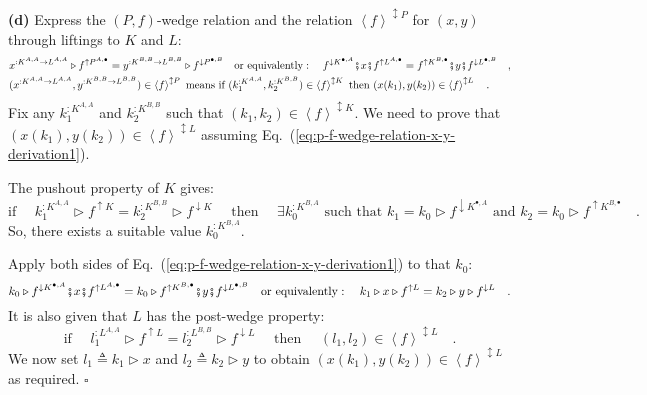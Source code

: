 \textbf{(d)} Express the $\left(P,f\right)$-wedge relation and the
relation $\left<f\right>^{\updownarrow P}$ for $(x,y)$ through liftings
to $K$ and $L$:
\begin{align}
 & x^{:K^{A,A}\rightarrow L^{A,A}}\triangleright f^{\uparrow P^{A,\bullet}}=y^{:K^{B,B}\rightarrow L^{B,B}}\triangleright f^{\downarrow P^{\bullet,B}}\quad\text{or equivalently}:\quad f^{\downarrow K^{\bullet,A}}\bef x\bef f^{\uparrow L^{A,\bullet}}=f^{\uparrow K^{B,\bullet}}\bef y\bef f^{\downarrow L^{\bullet,B}}\quad,\label{eq:p-f-wedge-relation-x-y-derivation1}\\
 & (x^{:K^{A,A}\rightarrow L^{A,A}},y^{:K^{B,B}\rightarrow L^{B,B}})\in\left<f\right>^{\updownarrow P}\text{ means if }(k_{1}^{:K^{A,A}},k_{2}^{:K^{B,B}})\in\left<f\right>^{\updownarrow K}\text{ then }(x(k_{1}),y(k_{2}))\in\left<f\right>^{\updownarrow L}\quad.\nonumber 
\end{align}
Fix any $k_{1}^{:K^{A,A}}$ and $k_{2}^{:K^{B,B}}$ such that $(k_{1},k_{2})\in\left<f\right>^{\updownarrow K}$.
We need to prove that $(x(k_{1}),y(k_{2}))\in\left<f\right>^{\updownarrow L}$
assuming Eq.~(\ref{eq:p-f-wedge-relation-x-y-derivation1}).

The pushout property of $K$ gives:
\[
\text{if }\quad k_{1}^{:K^{A,A}}\triangleright f^{\uparrow K}=k_{2}^{:K^{B,B}}\triangleright f^{\downarrow K}\quad\text{ then }\quad\exists k_{0}^{:K^{B,A}}\text{ such that }k_{1}=k_{0}\triangleright f^{\downarrow K^{\bullet,A}}\text{ and }k_{2}=k_{0}\triangleright f^{\uparrow K^{B,\bullet}}\quad.
\]
So, there exists a suitable value $k_{0}^{:K^{B,A}}$.%
\begin{comment}
By Statement~\ref{subsec:Statement-wedge-law-from-parametricity}(a),
the values $k_{1}$, $k_{2}$ are in the $\left(P,f\right)$-wedge
relation: $k_{1}\triangleright f^{\uparrow K}=k_{2}\triangleright f^{\downarrow K}$.
\end{comment}
{} Apply both sides of Eq.~(\ref{eq:p-f-wedge-relation-x-y-derivation1})
to that $k_{0}$:
\[
k_{0}\triangleright f^{\downarrow K^{\bullet,A}}\bef x\bef f^{\uparrow L^{A,\bullet}}=k_{0}\triangleright f^{\uparrow K^{B,\bullet}}\bef y\bef f^{\downarrow L^{\bullet,B}}\quad\text{or equivalently}:\quad k_{1}\triangleright x\triangleright f^{\uparrow L}=k_{2}\triangleright y\triangleright f^{\downarrow L}\quad.
\]
 It is also given that $L$ has the post-wedge property:
\[
\text{if }\quad l_{1}^{:L^{A,A}}\triangleright f^{\uparrow L}=l_{2}^{:L^{B,B}}\triangleright f^{\downarrow L}\quad\text{ then }\quad(l_{1},l_{2})\in\left<f\right>^{\updownarrow L}\quad.
\]
We now set $l_{1}\triangleq k_{1}\triangleright x$ and $l_{2}\triangleq k_{2}\triangleright y$
to obtain $(x(k_{1}),y(k_{2}))\in\left<f\right>^{\updownarrow L}$
as required. $\square$

